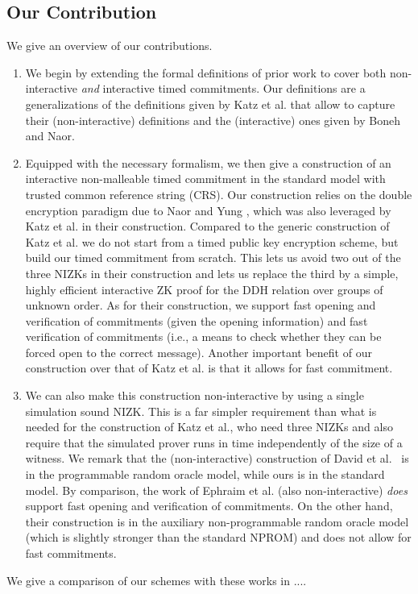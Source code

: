 \subsection{Our Contribution}
We give an overview of our contributions. 
\begin{enumerate}
\item We begin by extending the formal definitions of prior work to cover both non-interactive \emph{and} interactive timed commitments. Our definitions are a generalizations  of the definitions given by Katz et al. that allow to capture their (non-interactive) definitions and the (interactive) ones given by Boneh and Naor.
\item Equipped with the necessary formalism, we then give a construction of an interactive non-malleable timed commitment in the standard model with trusted common reference string (CRS). Our construction relies on the double encryption paradigm due to Naor and Yung \cite{STOC:NaoYun90}, which was also leveraged by Katz et al. in their construction. Compared to the generic construction of Katz et al. we do not start from a timed public key encryption scheme, but build our timed commitment from scratch. This lets us avoid two out of the three NIZKs in their construction and lets us replace the third by a simple, highly efficient interactive ZK proof for the DDH relation over groups of unknown order. As for their construction, we support fast opening and verification of commitments (given the opening information) and fast verification of commitments (i.e., a means to check whether they can be forced open to the correct message). Another important benefit of our construction over that of Katz et al. is that it allows for fast commitment. 
\item We can also make this construction non-interactive by using a single simulation sound NIZK. This is a far simpler requirement than what is needed for the construction of Katz et al., who need three NIZKs and also require that the simulated prover runs in time independently of the size of a witness. We remark that the (non-interactive) construction of David et al.~\cite{EC:BDDNO21} is in the programmable random oracle model, while ours is in the standard model. By comparison, the work of Ephraim et al. \cite{EPRINT:EFKP20a} (also non-interactive) \emph{does} support fast opening and verification of commitments. On the other hand, their construction is in the auxiliary non-programmable random oracle model (which is slightly stronger than the standard NPROM) and does not allow for fast commitments.
\end{enumerate}

We give a comparison of our schemes with these works in ....




